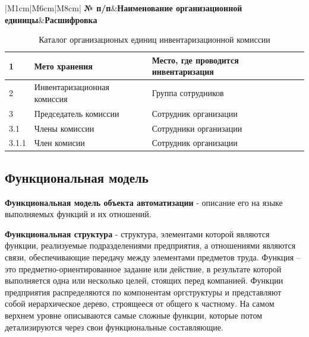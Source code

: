 \begin{table}[h!]
    \centering

    \footnotesize

    \caption{Каталог организационых единиц инвентаризационной комиссии}

    \label{table:ARIS_OrganizationalChart_InventoryCommission}

    \begin{tabular}{|M{1cm}|M{6cm}|M{8cm}|} 
        \hline
        \textbf{№ п/п}&\textbf{Наименование организационной единицы}&\textbf{Расшифровка}\\
    \end{tabular}

    \begin{tabular}{|p{1cm}|p{6cm}|p{8cm}|} 
        \hline
        1       &Мето хранения                  &Место, где проводится инвентаризация\\ \hline
        2       &Инвентаризационная комиссия    &Группа сотрудников\\ \hline
        3       &Председатель комиссии          &Сотрудник организации\\ \hline
        3.1     &Члены комиссии                 &Сотрудники организации\\ \hline
        3.1.1   &Член комисии                   &Сотрудник организации\\ \hline

    \end{tabular}
\end{table}

\newpage
\subsection{Функциональная модель}

\textbf{Функциональная модель объекта автоматизации} - описание его на языке выполняемых функций и их отношений.

\textbf{Функциональная структура} - структура, элементами которой являются функции,
реализуемые подразделениями предприятия, а отношениями являются связи,
обеспечивающие передачу между элементами предметов труда.
Функция – это предметно-ориентированное задание или действие,
в результате которой выполняется одна или несколько целей, стоящих перед компанией.
Функции предприятия распределяются по компонентам оргструктуры и представляют собой иерархическое дерево,
строящееся от общего к частному.
На самом верхнем уровне описываются самые сложные функции,
которые потом детализируются через свои функциональные составляющие.

